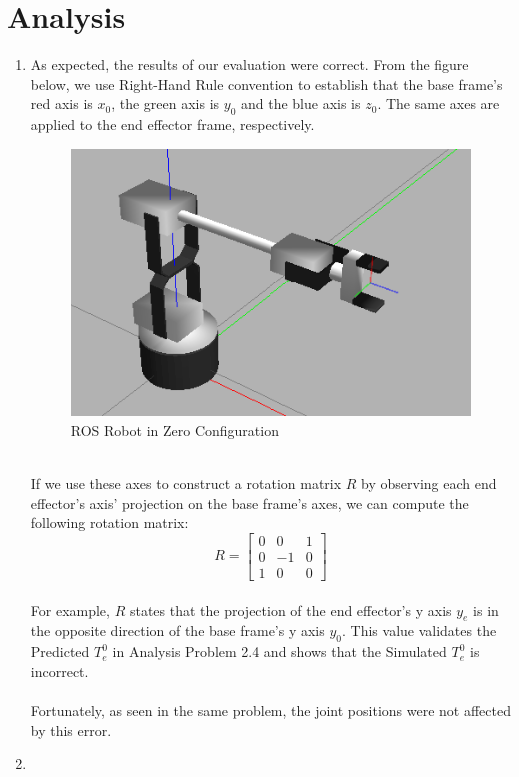 \documentclass[12pt]{article}
\begin{document}
\section{Analysis}
\begin{enumerate}
\item As expected, the results of our evaluation were correct. From the figure below, we use Right-Hand Rule convention to establish that the base frame's red axis is $x_{0}$, the green axis is $y_{0}$ and the blue axis is $z_{0}$. The same axes are applied to the end effector frame, respectively. \\\begin{figure} [h]
	\centering 
	\includegraphics[scale=2]{ImageOfRobotZeroConfig.png}
	\caption{ROS Robot in Zero Configuration}
	\end{figure} \\
If we use these axes to construct a rotation matrix $R$ by observing each end effector's axis' projection on the base frame's axes, we can compute the following rotation matrix:
\\
\begin{equation}
R = \begin{bmatrix}
	0 & 0 & 1 \\
	0 & -1 & 0\\
	1 & 0 & 0
	\end{bmatrix}
\end{equation}
\\
For example, $R$ states that the projection of the end effector's y axis $y_{e}$ is in the opposite direction of the base frame's y axis $y_{0}$. This value validates the Predicted $T^{0}_{e}$ in Analysis Problem 2.4 and shows that the Simulated $T^{0}_{e}$ is incorrect.\\\\Fortunately, as seen in the same problem, the joint positions were not affected by this error.


\item 
\end{enumerate}
\end{document}
